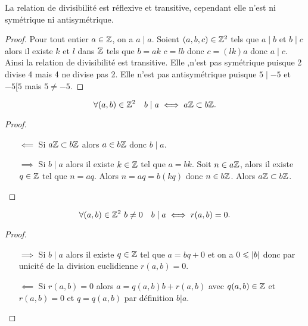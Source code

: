  \begin{prop}
   La relation de divisibilité est réflexive et transitive, cependant elle n'est ni symétrique ni antisymétrique.
 \end{prop}
 \begin{proof}
   Pour tout entier \(a \in \mathbb{Z}\), on a \(a\mid a\). Soient \((a,b,c) \in \mathbb{Z}^2\) tels que \(a\mid b\) et \(b\mid c\) alors il existe \(k\) et \(l\) dans \(\mathbb{Z}\) tels que \(b=ak\) \(c=lb\) donc \(c=(lk)a\) donc \(a\mid c\). Ainsi la relation de divisibilité est transitive. Elle ,n'est pas symétrique puisque 2 divise 4 mais 4 ne divise pas 2. Elle n'est pas antisymétrique puisque \(5\mid -5\) et \(-5[5\) mais \(5 \neq -5\).
 \end{proof}
 \begin{prop}
   \begin{equation}
     \forall (a,b) \in \mathbb{Z}^2 \quad b\mid a \iff a\mathbb{Z} \subset b\mathbb{Z}.
   \end{equation}
 \end{prop}
 \begin{proof}
   \begin{itemize}
   \item[\(\impliedby\)] Si \(a\mathbb{Z} \subset b\mathbb{Z}\) alors \(a \in b\mathbb{Z}\) donc \(b\mid a\).
   \item[\(\implies\)] Si \(b\mid a\) alors il existe \(k \in \mathbb{Z}\) tel que \(a=bk\). Soit \(n \in a\mathbb{Z}\), alors il existe \(q \in \mathbb{Z}\) tel que \(n=aq\). Alors \(n=aq=b(kq)\) donc \(n \in b\mathbb{Z}\). Alors \(a\mathbb{Z} \subset b\mathbb{Z}\).
   \end{itemize}
 \end{proof}
 \begin{prop}
   \begin{equation}
     \forall (a,b) \in \mathbb{Z}^2 \ b\neq 0 \quad b\mid a \iff r(a,b)=0.
   \end{equation}
 \end{prop}
 \begin{proof}
   \begin{itemize}
   \item[\(\implies\)] Si \(b\mid a\) alors il existe \(q \in \mathbb{Z}\) tel que \(a=bq+0\) et on a \(0\leqslant \left\lvert b\right\rvert\) donc par unicité de la division euclidienne \(r(a,b)=0\).
   \item[\(\impliedby\)] Si \(r(a,b)=0\) alors \(a=q(a,b) b+r(a,b)\) avec \(q(a,b) \in \mathbb{Z}\) et \(r(a,b)=0\) et \(q=q(a,b)\) par définition \(b|a\).
   \end{itemize}
 \end{proof}

